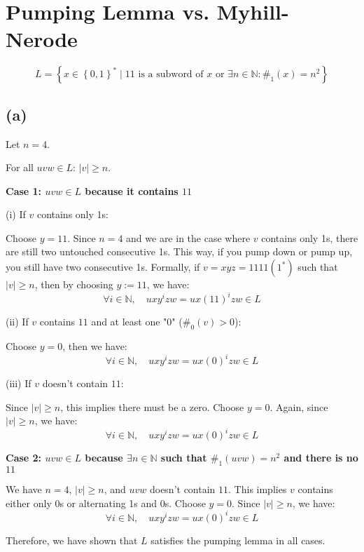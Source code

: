 



\setcounter{section}{2}

\section{Pumping Lemma vs. Myhill-Nerode}

$$L = \left\{ x \in \left\{0,1\right\}^{\ast} \mid 11\text{ is a subword of }x\text{ or } \exists n \in \mathbb{N}:\#_{1}(x)=n^{2}\right\}$$

\subsection{(a)}
Let \( n = 4 \).

For all \( uvw \in L \): \( |v| \geq n \).

\textbf{Case 1: \( uvw \in L \) because it contains \( 11 \)}

(i) If \( v \) contains only 1s:

Choose \( y = 11 \). Since \( n = 4 \) and we are in the case where \( v \) contains only 1s, there are still two untouched consecutive 1s. This way, if you pump down or pump up, you still have two consecutive 1s. Formally, if \( v = xyz = 1111(1^*) \) such that \( |v| \geq n \), then by choosing \( y := 11 \), we have:
\[
\forall i \in \mathbb{N}, \quad uxy^i zw = ux(11)^i zw \in L
\]

(ii) If \( v \) contains \( 11 \) and at least one "0" (\( \#_0(v) > 0 \)):

Choose \( y = 0 \), then we have:
\[
\forall i \in \mathbb{N}, \quad uxy^i zw = ux(0)^i zw \in L
\]

(iii) If \( v \) doesn’t contain \( 11 \):

Since \( |v| \geq n \), this implies there must be a zero. Choose \( y = 0 \). Again, since \( |v| \geq n \), we have:
\[
\forall i \in \mathbb{N}, \quad uxy^i zw = ux(0)^i zw \in L
\]

\textbf{Case 2: \( uvw \in L \) because \( \exists n \in \mathbb{N} \) such that \( \#_{1}(uvw) = n^2 \) and there is no \( 11 \)}

We have \( n = 4 \), \( |v| \geq n \), and \( uvw \) doesn’t contain \( 11 \). This implies \( v \) contains either only 0s or alternating 1s and 0s. Choose \( y = 0 \). Since \( |v| \geq n \), we have:
\[
\forall i \in \mathbb{N}, \quad uxy^i zw = ux(0)^i zw \in L
\]

Therefore, we have shown that \( L \) satisfies the pumping lemma in all cases.

